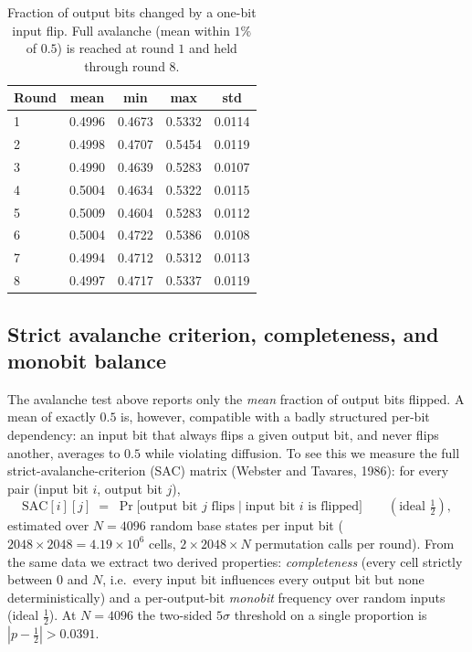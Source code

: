 \documentclass[11pt]{article}
\begin{document}
\begin{table}[h]
\centering
\begin{tabular}{lcccc}
  \toprule
  \textbf{Round} & \textbf{mean} & \textbf{min} & \textbf{max} & \textbf{std} \\
  \midrule
  1 & 0.4996 & 0.4673 & 0.5332 & 0.0114 \\
  2 & 0.4998 & 0.4707 & 0.5454 & 0.0119 \\
  3 & 0.4990 & 0.4639 & 0.5283 & 0.0107 \\
  4 & 0.5004 & 0.4634 & 0.5322 & 0.0115 \\
  5 & 0.5009 & 0.4604 & 0.5283 & 0.0112 \\
  6 & 0.5004 & 0.4722 & 0.5386 & 0.0108 \\
  7 & 0.4994 & 0.4712 & 0.5312 & 0.0113 \\
  8 & 0.4997 & 0.4717 & 0.5337 & 0.0119 \\
  \bottomrule
\end{tabular}
\caption{Fraction of output bits changed by a one-bit input flip. Full avalanche
(mean within $1\%$ of $0.5$) is reached at round $1$ and held through round $8$.}
\end{table}

\subsection{Strict avalanche criterion, completeness, and monobit balance}
The avalanche test above reports only the \emph{mean} fraction of output bits
flipped. A mean of exactly $0.5$ is, however, compatible with a badly structured
per-bit dependency: an input bit that always flips a given output bit, and never
flips another, averages to $0.5$ while violating diffusion. To see this we
measure the full strict-avalanche-criterion (SAC) matrix (Webster and Tavares, 1986): for
every pair (input bit $i$, output bit $j$),
\[
  \mathrm{SAC}[i][j] \;=\; \Pr\!\big[\text{output bit } j \text{ flips}
  \;\big|\; \text{input bit } i \text{ is flipped}\big]
  \qquad(\text{ideal } \tfrac12),
\]
estimated over $N=4096$ random base states per input bit ($2048\times2048=
4.19\times10^{6}$ cells, $2\times2048\times N$ permutation calls per round). From
the same data we extract two derived properties: \emph{completeness} (every cell
strictly between $0$ and $N$, i.e.\ every input bit influences every output bit
but none deterministically) and a per-output-bit \emph{monobit} frequency over
random inputs (ideal $\tfrac12$). At $N=4096$ the two-sided $5\sigma$ threshold
on a single proportion is $|p-\tfrac12|>0.0391$.
\end{document}
